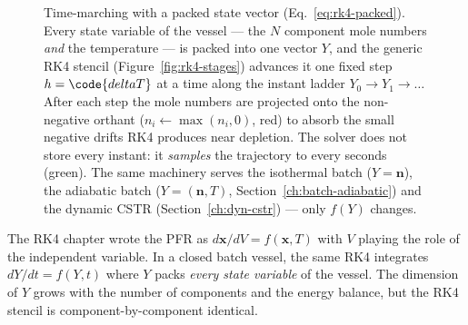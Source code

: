 \documentclass[11pt,a4paper]{article}
\newcommand{\xv}{\mathbf{x}}
\newcommand{\nv}{\mathbf{n}}                          %
\begin{document}
\begin{figure}[ht]
\caption{Time-marching with a packed state vector
(Eq.~\ref{eq:rk4-packed}).  Every state variable of the vessel --- the
$N$ component mole numbers \emph{and} the temperature --- is packed into
one vector $Y$, and the generic RK4 stencil
(Figure~\ref{fig:rk4-stages}) advances it one fixed step
$h=\code{deltaT}$ at a time along the instant ladder $Y_0\to Y_1\to\dots$
After each step the mole numbers are projected onto the non-negative
orthant ($n_i\leftarrow\max(n_i,0)$, red) to absorb the small negative
drifts RK4 produces near depletion.  The solver does not store every
instant: it \emph{samples} the trajectory to  every
 seconds (green).  The same machinery serves the
isothermal batch ($Y=\nv$), the adiabatic batch ($Y=(\nv,T)$,
Section~\ref{ch:batch-adiabatic}) and the dynamic CSTR
(Section~\ref{ch:dyn-cstr}) --- only $f(Y)$ changes.}
\label{fig:time-march-ladder}
\end{figure}


\begin{whatyoulllearn}
The RK4 chapter wrote the PFR as $d\xv / dV = f(\xv, T)$ with $V$
playing the role of the independent variable.  In a closed batch
vessel, the same RK4 integrates $dY / dt = f(Y, t)$ where $Y$ packs
\emph{every state variable} of the vessel.  The dimension of $Y$
grows with the number of components and the energy balance, but the
RK4 stencil is component-by-component identical.
\end{whatyoulllearn}
\end{document}
